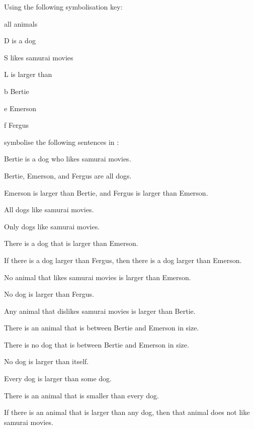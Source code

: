 \problempart 
Using the following symbolisation key:
\begin{ekey}
\item[\text{domain}] all animals
\item[D]  is a dog
\item[S]  likes samurai movies
\item[L]  is larger than 
\item[b] Bertie
\item[e] Emerson
\item[f] Fergus
\end{ekey}
symbolise the following sentences in \FOL:
\begin{earg}
\item Bertie is a dog who likes samurai movies.
\item Bertie, Emerson, and Fergus are all dogs.
\item Emerson is larger than Bertie, and Fergus is larger than Emerson.
\item All dogs like samurai movies.
\item Only dogs like samurai movies.
\item There is a dog that is larger than Emerson.
\item If there is a dog larger than Fergus, then there is a dog larger than Emerson.
\item No animal that likes samurai movies is larger than Emerson.
\item No dog is larger than Fergus.
\item Any animal that dislikes samurai movies is larger than Bertie.
\item There is an animal that is between Bertie and Emerson in size.
\item There is no dog that is between Bertie and Emerson in size.
\item No dog is larger than itself.
\item Every dog is larger than some dog.
\item There is an animal that is smaller than every dog.
\item If there is an animal that is larger than any dog, then that animal does not like samurai movies.
\end{earg}

